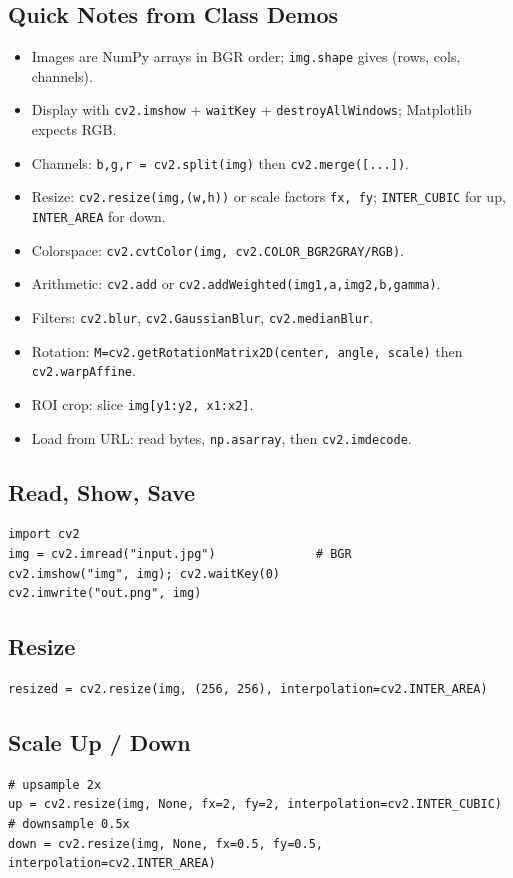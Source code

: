 \subsection*{Quick Notes from Class Demos}
\begin{itemize}
    \item Images are NumPy arrays in BGR order; \texttt{img.shape} gives (rows, cols, channels).
    \item Display with \texttt{cv2.imshow} + \texttt{waitKey} + \texttt{destroyAllWindows}; Matplotlib expects RGB.
    \item Channels: \texttt{b,g,r = cv2.split(img)} then \texttt{cv2.merge([...])}.
    \item Resize: \texttt{cv2.resize(img,(w,h))} or scale factors \texttt{fx, fy}; \texttt{INTER\_CUBIC} for up, \texttt{INTER\_AREA} for down.
    \item Colorspace: \texttt{cv2.cvtColor(img, cv2.COLOR\_BGR2GRAY/RGB)}.
    \item Arithmetic: \texttt{cv2.add} or \texttt{cv2.addWeighted(img1,a,img2,b,gamma)}.
    \item Filters: \texttt{cv2.blur}, \texttt{cv2.GaussianBlur}, \texttt{cv2.medianBlur}.
    \item Rotation: \texttt{M=cv2.getRotationMatrix2D(center, angle, scale)} then \texttt{cv2.warpAffine}.
    \item ROI crop: slice \texttt{img[y1:y2, x1:x2]}.
    \item Load from URL: read bytes, \texttt{np.asarray}, then \texttt{cv2.imdecode}.
\end{itemize}

\subsection*{Read, Show, Save}
\begin{lstlisting}
import cv2
img = cv2.imread("input.jpg")              # BGR
cv2.imshow("img", img); cv2.waitKey(0)
cv2.imwrite("out.png", img)
\end{lstlisting}

\subsection*{Resize}
\begin{lstlisting}
resized = cv2.resize(img, (256, 256), interpolation=cv2.INTER_AREA)
\end{lstlisting}

\subsection*{Scale Up / Down}
\begin{lstlisting}
# upsample 2x
up = cv2.resize(img, None, fx=2, fy=2, interpolation=cv2.INTER_CUBIC)
# downsample 0.5x
down = cv2.resize(img, None, fx=0.5, fy=0.5, interpolation=cv2.INTER_AREA)
\end{lstlisting}

